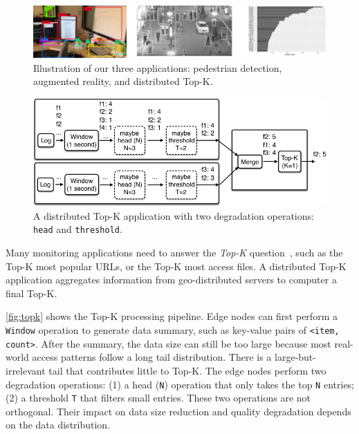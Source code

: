 \documentclass[twocolumn, 9pt]{article}
\begin{document}
\begin{figure}
  \centering
  \includegraphics[width=\columnwidth]{figures/apps.pdf}
  \caption{Illustration of our three applications: pedestrian detection,
    augmented reality, and distributed Top-K.}
  \label{fig:three-apps}
\end{figure}

\begin{figure}
  \centering
  \includegraphics[width=\columnwidth]{figures/topk.pdf}
  \caption{A distributed Top-K application with two degradation operations:
    \texttt{head} and \texttt{threshold}.}
  \label{fig:topk}
\end{figure}

 Many monitoring applications need to answer the
\textit{Top-K} question~\cite{babcock2003distributed}, such as the Top-K most
popular URLs, or the Top-K most access files. A distributed Top-K application
aggregates information from geo-distributed servers to computer a final Top-K.

\autoref{fig:topk} shows the Top-K processing pipeline. Edge nodes can first
perform a \texttt{Window} operation to generate data summary, such as key-value
pairs of \texttt{<item, count>}. After the summary, the data size can still be
too large because most real-world access patterns follow a long tail
distribution. There is a large-but-irrelevant tail that contributes little to
Top-K. The edge nodes perform two degradation operations: (1) a head
(\texttt{N}) operation that only takes the top \texttt{N} entries; (2) a
threshold \texttt{T} that filters small entries. These two operations are not
orthogonal. Their impact on data size reduction and quality degradation depends
on the data distribution.
\end{document}
